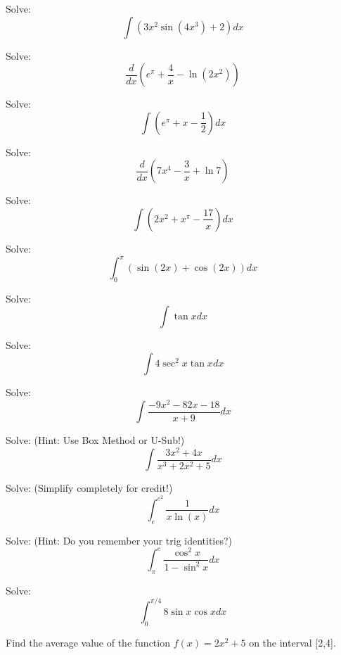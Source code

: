 \documentclass{exam}
\begin{document}
\begin{questions}
\question[5] Solve: \[\int(3x^2\sin(4x^3)+2)dx\]


\question[5] Solve: \[\frac{d}{dx}(e^\pi+\frac{4}{x}-\ln(2x^2))\]

\question[5] Solve: \[\int (e^\pi+x-\frac{1}{2})dx\]

\newpage

\question[5] Solve: \[\frac{d}{dx}(7x^4-\frac{3}{x}+\ln7)\]

\question[5] Solve: \[\int (2x^2+x^\pi-\frac{17}{x})dx\]

\question[5] Solve: \[\int_{0}^{\pi}(\sin(2x)+\cos(2x))dx\]

\question[5] Solve: \[\int \tan xdx\]

\newpage

\question[5] Solve: \[\int 4\sec^2x\tan xdx\]

\question[5] Solve: \[\int \frac{-9x^2-82x-18}{x+9}dx\]

\question[5] Solve: (Hint: Use Box Method or U-Sub!)\[\int \frac{3x^2+4x}{x^3+2x^2+5}dx\]

\question[5] Solve: (Simplify completely for credit!)\[\int_{e}^{e^2}\frac{1}{x\ln(x)}dx\]

\newpage

\question[5] Solve: (Hint: Do you remember your trig identities?)\[\int_{\pi}^{e} \frac{\cos^2x}{1-\sin^2x}dx \]

\question[5] Solve: \[\int_{0}^{\pi/4} 8\sin x\cos xdx\]

\question[5] Find the average value of the function \(f(x) = 2x^2+5\) on the interval [2,4].


\end{questions}
\end{document}

